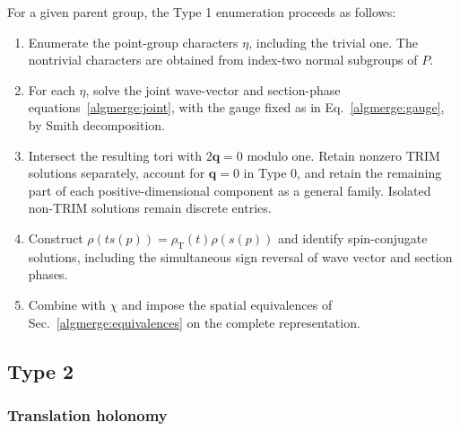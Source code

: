 For a given parent group, the Type 1 enumeration proceeds as follows:
\begin{enumerate}
\renewcommand{\labelenumi}{(\roman{enumi})}
\item Enumerate the point-group characters $\eta$, including the
trivial one. The nontrivial characters are obtained from index-two
normal subgroups of $P$.
\item For each $\eta$, solve the joint wave-vector and section-phase
equations~\eqref{algmerge:joint}, with the gauge fixed as in
Eq.~\eqref{algmerge:gauge}, by Smith decomposition.
\item Intersect the resulting tori with $2\bm q=0$ modulo one.
Retain nonzero TRIM solutions separately, account for $\bm q=0$
in Type 0, and retain the remaining part of each positive-dimensional
component as a general family. Isolated non-TRIM solutions remain
discrete entries.
\item Construct $\rho(t s(p))=\rho_{\mathrm T}(t)\rho(s(p))$ and
identify spin-conjugate solutions, including the simultaneous sign
reversal of wave vector and section phases.
\item Combine with $\chi$ and impose the spatial equivalences of
Sec.~\ref{algmerge:equivalences} on the complete representation.
\end{enumerate}

\subsection{Type 2}
\label{algmerge:type2}

\subsubsection{Translation holonomy}

